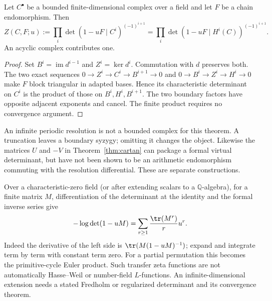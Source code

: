 \begin{theorem}\label{thm:cohom}
Let $C^\bullet$ be a bounded finite-dimensional complex over a field and let $F$ be a chain endomorphism. Then
\[
 Z(C,F;u):=\prod_i\det(1-uF\mid C^i)^{(-1)^{i+1}}
  =\prod_i\det(1-uF\mid H^i(C))^{(-1)^{i+1}}.
\]
An acyclic complex contributes one.
\end{theorem}
\begin{proof}
Set $B^i=\operatorname{im}d^{i-1}$ and $Z^i=\ker d^i$. Commutation with $d$ preserves both. The two exact sequences
$0\to Z^i\to C^i\to B^{i+1}\to0$ and
$0\to B^i\to Z^i\to H^i\to0$ make $F$ block triangular in adapted bases. Hence its characteristic determinant on $C^i$ is the product of those on $B^i,H^i,B^{i+1}$. The two boundary factors have opposite adjacent exponents and cancel. The finite product requires no convergence argument.
\end{proof}

An infinite periodic resolution is not a bounded complex for this theorem. A truncation leaves a boundary syzygy; omitting it changes the object. Likewise the matrices $U$ and $-V$ in Theorem~\ref{thm:cartan} can package a formal virtual determinant, but have not been shown to be an arithmetic endomorphism commuting with the resolution differential. These are separate constructions.

Over a characteristic-zero field (or after extending scalars to a $\mathbb Q$-algebra), for a finite matrix $M$, differentiation of the determinant at the identity and the formal inverse series give
\[
 -\log\det(1-uM)=\sum_{r\geq1}\frac{\tr(M^r)}r u^r.
\]
Indeed the derivative of the left side is $\tr(M(1-uM)^{-1})$; expand and integrate term by term with constant term zero. For a partial permutation this becomes the primitive-cycle Euler product. Such transfer zeta functions are not automatically Hasse--Weil or number-field $L$-functions. An infinite-dimensional extension needs a stated Fredholm or regularized determinant and its convergence theorem.

